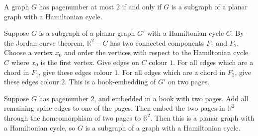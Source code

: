 \begin{lemma}\label{lem:Pagenumber_2}
	A graph \(G\) has pagenumber at most 2 if and only if \(G\) is a subgraph of a planar graph with a Hamiltonian cycle.
\end{lemma}
Suppose $G$ is a subgraph of a planar graph $G'$ with a Hamiltonian cycle $C$. By the Jordan curve theorem, $\mathbb{R}^2 - C$ has two connected components $F_1$ and $F_2$. Choose a vertex $x_0$ and order the vertices with respect to the Hamiltonian cycle $C$ where $x_0$ is the first vertex. Give edges on $C$ colour $1$. For all edges which are a chord in $F_1$, give these edges colour $1$. For all edges which are a chord in $F_2$, give these edges colour $2$. This is a book-embedding of $G'$ on two pages. 
\par
Suppose $G$ has pagenumber $2$, and embedded in a book with two pages. Add all remaining spine edges to one of the pages. Then embed the two pages in $\mathbb{R}^2$ through the homeomorphism of two pages to $\mathbb{R}^2$. Then this is a planar graph with a Hamiltonian cycle, so $G$ is a subgraph of a graph with a Hamiltonian cycle.
